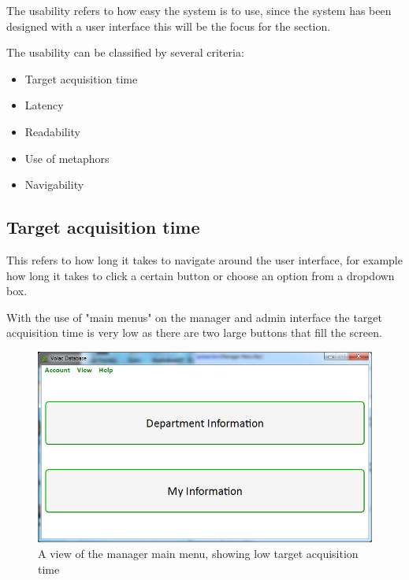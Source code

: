 The usability refers to how easy the system is to use, since the system has been designed with a user interface this will be the focus for the section. 

The usability can be classified by several criteria:
\begin{itemize}
\item{Target acquisition time}
\item{Latency}
\item{Readability}
\item{Use of metaphors}
\item{Navigability}
\end{itemize}

\subsection{Target acquisition time}

This refers to how long it takes to navigate around the user interface, for example how long it takes to click a certain button or choose an option from a dropdown box.

With the use of "main menus" on the manager and admin interface the target acquisition time is very low as there are two large buttons that fill the screen.

\begin{figure}[H]
    \includegraphics[width=\textwidth]{./Maintenance/Images/ManagerMM.png}
    \caption{A view of the manager main menu, showing low target acquisition time} 
\end{figure}

